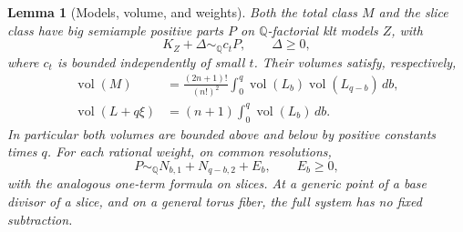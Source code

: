 \documentclass[11pt,letterpaper]{article}
\newtheorem{lemma}[theorem]{Lemma}
\theoremstyle{definition}
\theoremstyle{remark}
\begin{document}
\begin{lemma}[Models, volume, and weights]\label{proj:jet:bundle-models}
Both the total class \(M\) and the slice class have big semiample
positive parts \(P\) on \(\mathbb{Q}\)-factorial klt models \(Z\), with
\[
 K_Z+\Delta\sim_{\mathbb{Q}}c_tP,\qquad \Delta\ge0,
\]
where \(c_t\) is bounded independently of small \(t\).
Their volumes satisfy, respectively,
\begin{align}
 \operatorname{vol}(M)&=\frac{(2n+1)!}{(n!)^2}
   \int_0^q\operatorname{vol}(L_b)\operatorname{vol}(L_{q-b})\,db,\label{proj:jet:total-volume}\\
 \operatorname{vol}(L+q\xi)&=(n+1)\int_0^q\operatorname{vol}(L_b)\,db.\label{proj:jet:slice-volume}
\end{align}
In particular both volumes are bounded above and below by positive
constants times \(q\).  For each rational weight, on common
resolutions,
\begin{equation}\label{proj:jet:weight-domination}
 P\sim_{\mathbb{Q}}N_{b,1}+N_{q-b,2}+E_b,\qquad E_b\ge0,
\end{equation}
with the analogous one-term formula on slices.
At a generic point of a base divisor of a slice, and on a general
torus fiber, the full system has no fixed subtraction.
\end{lemma}
\end{document}
